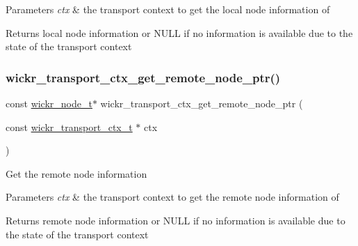 \begin{DoxyParams}{Parameters}
{\em ctx} & the transport context to get the local node information of \\
\hline
\end{DoxyParams}
\begin{DoxyReturn}{Returns}
local node information or N\+U\+LL if no information is available due to the state of the transport context 
\end{DoxyReturn}
\mbox{\label{group__wickr__transport__ctx_gad9baf62b25d23b9c6ecd5cec0fc9d6f5}} 
\subsubsection{\texorpdfstring{wickr\+\_\+transport\+\_\+ctx\+\_\+get\+\_\+remote\+\_\+node\+\_\+ptr()}{wickr\_transport\_ctx\_get\_remote\_node\_ptr()}}
{\footnotesize\ttfamily const \hyperlink{structwickr__node}{wickr\+\_\+node\+\_\+t}$\ast$ wickr\+\_\+transport\+\_\+ctx\+\_\+get\+\_\+remote\+\_\+node\+\_\+ptr (\begin{DoxyParamCaption}\item[{const \hyperlink{structwickr__transport__ctx}{wickr\+\_\+transport\+\_\+ctx\+\_\+t} $\ast$}]{ctx }\end{DoxyParamCaption})}

Get the remote node information


\begin{DoxyParams}{Parameters}
{\em ctx} & the transport context to get the remote node information of \\
\hline
\end{DoxyParams}
\begin{DoxyReturn}{Returns}
remote node information or N\+U\+LL if no information is available due to the state of the transport context 
\end{DoxyReturn}
\mbox{\label{group__wickr__transport__ctx_ga3ec320d2e4a4010ffa3f411c1ea1419a}} 
